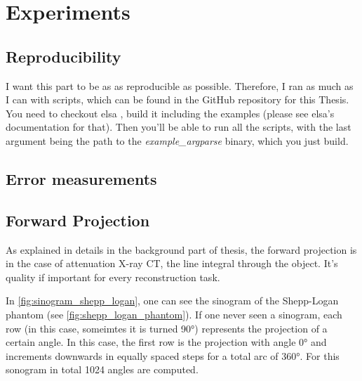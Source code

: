 \chapter{Experiments}\label{chap:experiments}

\section{Reproducibility}\label{sec:experiments_repoduction}

I want this part to be as as reproducible as possible. Therefore, I ran as much as I can with
scripts, which can be found in the GitHub repository for this Thesis. You need to checkout elsa
, build it including the examples (please see elsa's documentation for that).
Then you'll be able to run all the scripts, with the last argument being the path to the
\textit{example\_argparse} binary, which you just build.

\section{Error measurements}\label{sec:error_measurements}

\section{Forward Projection}\label{sec:experiments_forward_projection}


As explained in details in the background part of thesis, the forward projection is in the case of
attenuation X-ray CT, the line integral through the object. It's quality if important for every
reconstruction task.


In \autoref{fig:sinogram_shepp_logan}, one can see the sinogram of the Shepp-Logan phantom
 (see \autoref{fig:shepp_logan_phantom}). If one never
seen a sinogram, each row (in this case, someimtes it is turned 90°) represents the projection of a
certain angle. In this case, the first row is the projection with angle 0° and increments downwards
in equally spaced steps for a total arc of 360°. For this sonogram in total 1024 angles are
computed.

